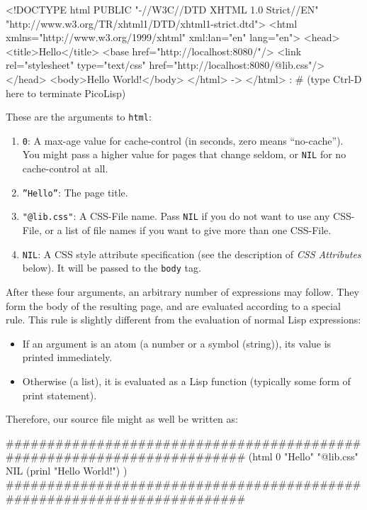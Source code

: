 \begin{wideverbatim}

<!DOCTYPE html PUBLIC "-//W3C//DTD XHTML 1.0 Strict//EN"
"http://www.w3.org/TR/xhtml1/DTD/xhtml1-strict.dtd">
<html xmlns="http://www.w3.org/1999/xhtml" xml:lan="en" lang="en">
<head>
<title>Hello</title>
<base href="http://localhost:8080/"/>
<link rel="stylesheet" type="text/css" href="http://localhost:8080/@lib.css"/>
</head>
<body>Hello World!</body>
</html>
-> </html>
:  # (type Ctrl-D here to terminate PicoLisp)
\end{wideverbatim}

These are the arguments to \texttt{html}:

\begin{enumerate}
\item \texttt{0}: A max-age value for cache-control (in seconds, zero means
   ``no-cache''). You might pass a higher value for pages that change
   seldom, or \texttt{NIL} for no cache-control at all.
\item \texttt{''Hello''}: The page title. 
\item \texttt{"@lib.css"}: A CSS-File name. Pass \texttt{NIL} if you
  do not want to use any CSS-File, or a list of file names if you want
  to give more than one CSS-File.
\item \texttt{NIL}: A CSS style attribute specification (see the description of
   \emph{CSS Attributes} below). It will be passed to the \texttt{body}
   tag.
\end{enumerate}

After these four arguments, an arbitrary number of expressions may
follow. They form the body of the resulting page, and are evaluated
according to a special rule. This rule is slightly different from the
evaluation of normal Lisp expressions:

\begin{itemize}
\item If an argument is an atom (a number or a symbol (string)), its value
   is printed immediately.
\item Otherwise (a list), it is evaluated as a Lisp function (typically
   some form of print statement).
\end{itemize}

Therefore, our source file might as well be written as:


\begin{wideverbatim}
########################################################################
(html 0 "Hello" "@lib.css" NIL
   (prinl "Hello World!") )
########################################################################
\end{wideverbatim}


